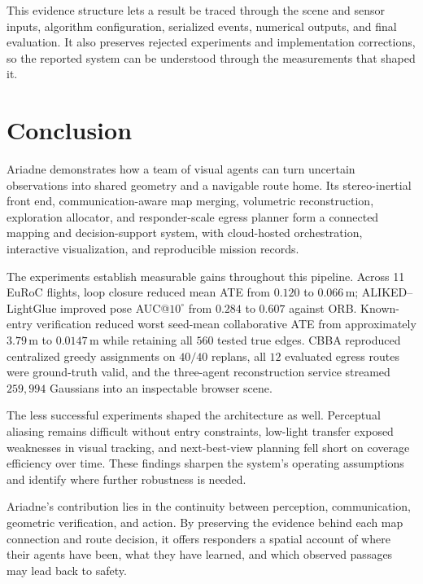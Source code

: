 \documentclass[10pt,a4paper]{article}
\begin{document}
This evidence structure lets a result be traced through
the scene and sensor inputs, algorithm configuration,
serialized events, numerical outputs, and final evaluation.
It also preserves rejected experiments and implementation
corrections, so the reported system can be understood
through the measurements that shaped it.


\section{Conclusion}

Ariadne demonstrates how a team of visual agents can turn uncertain
observations into shared geometry and a navigable route home.
Its stereo-inertial front end, communication-aware map merging,
volumetric reconstruction, exploration allocator, and responder-scale
egress planner form a connected mapping and decision-support system,
with cloud-hosted orchestration, interactive visualization, and
reproducible mission records.

The experiments establish measurable gains throughout this pipeline.
Across 11 EuRoC flights, loop closure reduced mean ATE from
$0.120$ to $0.066$\,m; ALIKED--LightGlue improved pose
AUC@$10^\circ$ from $0.284$ to $0.607$ against ORB.
Known-entry verification reduced worst seed-mean collaborative
ATE from approximately $3.79$\,m to $0.0147$\,m while retaining
all $560$ tested true edges. CBBA reproduced centralized greedy
assignments on $40/40$ replans, all $12$ evaluated egress routes
were ground-truth valid, and the three-agent reconstruction service
streamed $259{,}994$ Gaussians into an inspectable browser scene.

The less successful experiments shaped the architecture as well.
Perceptual aliasing remains difficult without entry constraints,
low-light transfer exposed weaknesses in visual tracking, and
next-best-view planning fell short on coverage efficiency over time.
These findings sharpen the system's operating assumptions and
identify where further robustness is needed.

Ariadne's contribution lies in the continuity between perception,
communication, geometric verification, and action. By preserving
the evidence behind each map connection and route decision, it
offers responders a spatial account of where their agents have
been, what they have learned, and which observed passages may
lead back to safety.
\end{document}
